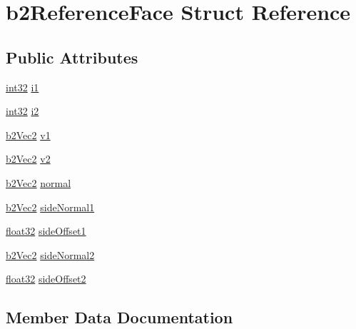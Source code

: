 \hypertarget{structb2_reference_face}{}\section{b2\+Reference\+Face Struct Reference}
\label{structb2_reference_face}
\subsection*{Public Attributes}
\begin{DoxyCompactItemize}
\item 
\mbox{\hyperlink{b2_settings_8h_a43d43196463bde49cb067f5c20ab8481}{int32}} \mbox{\hyperlink{structb2_reference_face_a987d346858f5c1dd1de0dfddab779324}{i1}}
\item 
\mbox{\hyperlink{b2_settings_8h_a43d43196463bde49cb067f5c20ab8481}{int32}} \mbox{\hyperlink{structb2_reference_face_a838ab3e4a81b71cfaa450eb214584353}{i2}}
\item 
\mbox{\hyperlink{structb2_vec2}{b2\+Vec2}} \mbox{\hyperlink{structb2_reference_face_a20165b58f2e81b78ed3a099ef85737ac}{v1}}
\item 
\mbox{\hyperlink{structb2_vec2}{b2\+Vec2}} \mbox{\hyperlink{structb2_reference_face_aa89eb5b51e9ee680b97c33041658f9ab}{v2}}
\item 
\mbox{\hyperlink{structb2_vec2}{b2\+Vec2}} \mbox{\hyperlink{structb2_reference_face_a4ba73696920306d3c8fecc35a4433029}{normal}}
\item 
\mbox{\hyperlink{structb2_vec2}{b2\+Vec2}} \mbox{\hyperlink{structb2_reference_face_a478026ee3fa0d8d1349b01928eb9e947}{side\+Normal1}}
\item 
\mbox{\hyperlink{b2_settings_8h_aacdc525d6f7bddb3ae95d5c311bd06a1}{float32}} \mbox{\hyperlink{structb2_reference_face_a7e2a902ed8f499fbb4305d51ce687876}{side\+Offset1}}
\item 
\mbox{\hyperlink{structb2_vec2}{b2\+Vec2}} \mbox{\hyperlink{structb2_reference_face_ad272f9369fbc1d28f60f77defd757dbd}{side\+Normal2}}
\item 
\mbox{\hyperlink{b2_settings_8h_aacdc525d6f7bddb3ae95d5c311bd06a1}{float32}} \mbox{\hyperlink{structb2_reference_face_a7fa70d9f4bfc4cdf792408ffe204d017}{side\+Offset2}}
\end{DoxyCompactItemize}


\subsection{Member Data Documentation}
\mbox{\label{structb2_reference_face_a987d346858f5c1dd1de0dfddab779324}} 
